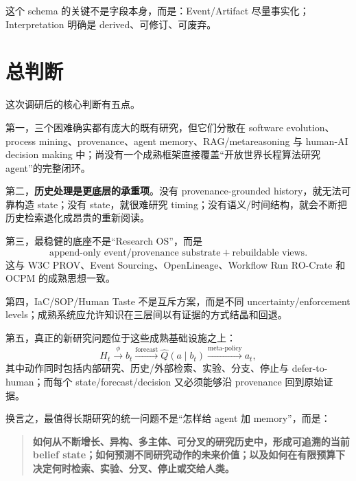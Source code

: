 \documentclass[11pt,a4paper]{ctexart}
\begin{document}
这个 schema 的关键不是字段本身，而是：Event/Artifact 尽量事实化；Interpretation 明确是 derived、可修订、可废弃。

\section{总判断}

这次调研后的核心判断有五点。

第一，三个困难确实都有庞大的既有研究，但它们分散在 software evolution、process mining、provenance、agent memory、RAG/metareasoning 与 human-AI decision making 中；尚没有一个成熟框架直接覆盖“开放世界长程算法研究 agent”的完整闭环。

第二，\textbf{历史处理是更底层的承重项}。没有 provenance-grounded history，就无法可靠构造 state；没有 state，就很难研究 timing；没有语义/时间结构，就会不断把历史检索退化成昂贵的重新阅读。

第三，最稳健的底座不是“Research OS”，而是
\begin{equation}
\boxed{\text{append-only event/provenance substrate}+\text{rebuildable views}.}
\end{equation}
这与 W3C PROV、Event Sourcing、OpenLineage、Workflow Run RO-Crate 和 OCPM 的成熟思想一致。

第四，IaC/SOP/Human Taste 不是互斥方案，而是不同 uncertainty/enforcement levels；成熟系统应允许知识在三层间以有证据的方式结晶和回退。

第五，真正的新研究问题位于这些成熟基础设施之上：
\begin{equation}
\boxed{
H_t\xrightarrow{\phi}b_t
\xrightarrow{\text{forecast}}\hat Q(a\mid b_t)
\xrightarrow{\text{meta-policy}}a_t,
}
\end{equation}
其中动作同时包括内部研究、历史/外部检索、实验、分支、停止与 defer-to-human；而每个 state/forecast/decision 又必须能够沿 provenance 回到原始证据。

换言之，最值得长期研究的统一问题不是“怎样给 agent 加 memory”，而是：
\begin{quote}
\textbf{如何从不断增长、异构、多主体、可分叉的研究历史中，形成可追溯的当前 belief state；如何预测不同研究动作的未来价值；以及如何在有限预算下决定何时检索、实验、分叉、停止或交给人类。}
\end{quote}

\printbibliography
\end{document}
